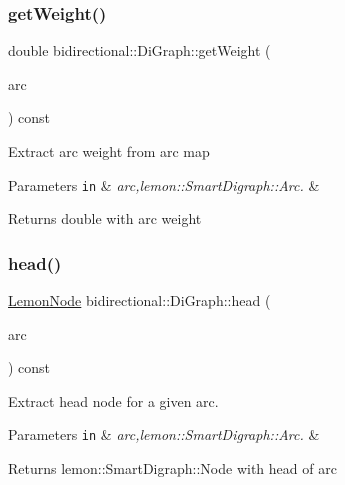 \subsubsection{\texorpdfstring{get\+Weight()}{getWeight()}}
{\footnotesize\ttfamily double bidirectional\+::\+Di\+Graph\+::get\+Weight (\begin{DoxyParamCaption}\item[{const \hyperlink{digraph_8h_ae6cfd87753a14ebe6d11871314aff34d}{Lemon\+Arc} \&}]{arc }\end{DoxyParamCaption}) const\hspace{0.3cm}{\ttfamily [inline]}}

Extract arc weight from arc map


\begin{DoxyParams}[1]{Parameters}
\mbox{\tt in}  & {\em arc,lemon\+::\+Smart\+Digraph\+::\+Arc.} & \\
\hline
\end{DoxyParams}
\begin{DoxyReturn}{Returns}
double with arc weight 
\end{DoxyReturn}
\mbox{\label{classbidirectional_1_1DiGraph_aa0379cf603a76b85a8ef3ca5ad03d4af}} 
\subsubsection{\texorpdfstring{head()}{head()}}
{\footnotesize\ttfamily \hyperlink{digraph_8h_a9e28ff6f29770c88642a42cab9f42fed}{Lemon\+Node} bidirectional\+::\+Di\+Graph\+::head (\begin{DoxyParamCaption}\item[{const \hyperlink{digraph_8h_ae6cfd87753a14ebe6d11871314aff34d}{Lemon\+Arc} \&}]{arc }\end{DoxyParamCaption}) const\hspace{0.3cm}{\ttfamily [inline]}}

Extract head node for a given arc.


\begin{DoxyParams}[1]{Parameters}
\mbox{\tt in}  & {\em arc,lemon\+::\+Smart\+Digraph\+::\+Arc.} & \\
\hline
\end{DoxyParams}
\begin{DoxyReturn}{Returns}
lemon\+::\+Smart\+Digraph\+::\+Node with head of arc 
\end{DoxyReturn}
\mbox{\label{classbidirectional_1_1DiGraph_a0be9d9f87409f523306babcfef8a7f46}} 
